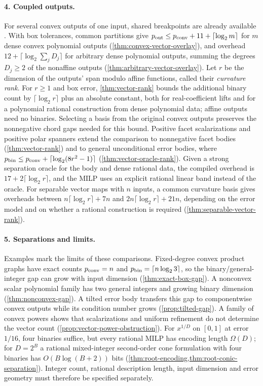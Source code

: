 \paragraph{4. Coupled outputs.}
For several convex outputs of one input, shared breakpoints are already
available \citep{lyu2026}. With box tolerances, common partitions give
$p_{\mathrm{out}}\le p_{\mathrm{conv}}+11+\lceil\log_2m\rceil$ for $m$ dense convex polynomial
outputs (\cref{thm:convex-vector-overlay}), and overhead
$12+\lceil\log_2\sum_jD_j\rceil$ for arbitrary dense polynomial outputs,
summing the degrees $D_j\ge2$ of the nonaffine outputs
(\cref{thm:arbitrary-vector-overlay}). Let $r$ be the dimension of the
outputs' span modulo affine functions, called their
\emph{curvature rank}. For
$r\ge1$ and box error, \cref{thm:vector-rank} bounds the additional
binary count by $\lceil\log_2r\rceil$ plus an absolute constant, both
for real-coefficient lifts and for a polynomial rational construction
from dense polynomial data; affine outputs need no binaries. Selecting a
basis from the original convex outputs preserves the nonnegative chord
gaps needed for this bound. Positive facet scalarizations and positive
polar spanners extend the comparison to nonnegative facet bodies
(\cref{thm:vector-rank}) and to general unconditional error bodies, where
$p_{\mathrm{bin}}\le p_{\mathrm{conv}}+\lceil\log_2(8r^2-1)\rceil$
(\cref{thm:vector-oracle-rank}). Given a strong separation oracle for
the body and dense rational data, the compiled overhead is
$17+2\lceil\log_2r\rceil$, and the MILP uses an explicit rational
linear band instead of the oracle. For separable vector maps
with $n$ inputs, a common curvature basis gives overheads between
$n\lceil\log_2r\rceil+7n$ and $2n\lceil\log_2r\rceil+21n$, depending on
the error model and on whether a rational construction is required
(\cref{thm:separable-vector-rank}).

\paragraph{5. Separations and limits.}
Examples mark the limits of these comparisons. Fixed-degree convex
product graphs have exact counts $p_{\mathrm{conv}}=n$ and
$p_{\mathrm{bin}}=\lceil n\log_2 3\rceil$, so the binary/general-integer gap can
grow with input dimension (\cref{thm:exact-box-gap}). A nonconvex
scalar polynomial family has two general integers and growing binary
dimension (\cref{thm:nonconvex-gap}). A tilted error body transfers this
gap to componentwise convex outputs while its condition number grows
(\cref{prop:tilted-gap}). A family of convex powers shows that
scalarizations and uniform refinement do not determine the vector count
(\cref{prop:vector-power-obstruction}). For $x^{1/D}$ on $[0,1]$ at error
$1/16$, four binaries suffice, but every rational MILP has encoding
length $\Omega(D)$; for $D=2^B$ a rational mixed-integer second-order
cone formulation with four binaries has $O(B\log(B+2))$ bits
(\cref{thm:root-encoding,thm:root-conic-separation}). Integer count,
rational description length, input dimension and error geometry must
therefore be specified separately.

